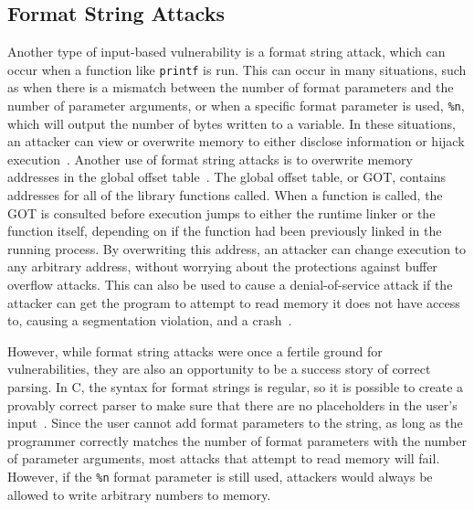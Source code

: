 \subsection{Format String Attacks}
\label{sec:formatStringAttacks}
Another type of input-based vulnerability is a format string attack, which can occur when a function like \texttt{printf} is run.  This can occur in many situations, such as when there is a mismatch between the number of format parameters and the number of parameter arguments, or when a specific format parameter is used, \texttt{\%n}, which will output the number of bytes written to a variable.  In these situations, an attacker can view or overwrite memory to either disclose information or hijack execution~\cite{newsham_2000}.  Another use of format string attacks is to overwrite memory addresses in the global offset table~\cite{scut2001exploiting}.  The global offset table, or GOT, contains addresses for all of the library functions called.  When a function is called, the GOT is consulted before execution jumps to either the runtime linker or the function itself, depending on if the function had been previously linked in the running process.  By overwriting this address, an attacker can change execution to any arbitrary address, without worrying about the protections against buffer overflow attacks.  This can also be used to cause a denial-of-service attack if the attacker can get the program to attempt to read memory it does not have access to, causing a segmentation violation, and a crash~\cite{scut2001exploiting}.

However, while format string attacks were once a fertile ground for vulnerabilities, they are also an opportunity to be a success story of correct parsing.  In C, the syntax for format strings is regular, so it is possible to create a provably correct parser to make sure that there are no  placeholders in the user's input~\cite{sassaman2013security}.  Since the user cannot add format parameters to the string, as long as the programmer correctly matches the number of format parameters with the number of parameter arguments, most attacks that attempt to read memory will fail.  However, if the \texttt{\%n} format parameter is still used, attackers would always be allowed to write arbitrary numbers to memory.

